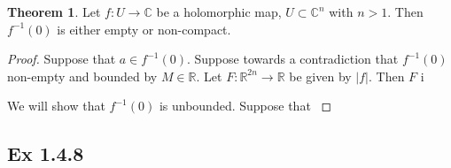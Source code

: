 \documentclass{article}
\theoremstyle{definition}
\newtheorem{theorem}{Theorem}[section]
\newcommand{\R}{\mathbb{R}}
\newcommand{\C}{\mathbb{C}}
\begin{document}
\begin{theorem}
	Let $f : U \to \C$ be a holomorphic map, $U \subset \C^{n}$ with $n > 1$.
	Then $f^{-1}(0)$ is either empty or non-compact.
\end{theorem}
\begin{proof}
	Suppose that $a \in f^{-1}(0)$. Suppose towards a contradiction that
	$f^{-1}(0)$ non-empty and bounded by $M \in \R$. Let 
	$F : \R^{2n} \to \R$ be given by $|f|$. Then $F$ i

	We will show that $f^{-1}(0)$ is unbounded.
	Suppose that $$	
\end{proof}

\subsection*{Ex 1.4.8}
\end{document}

